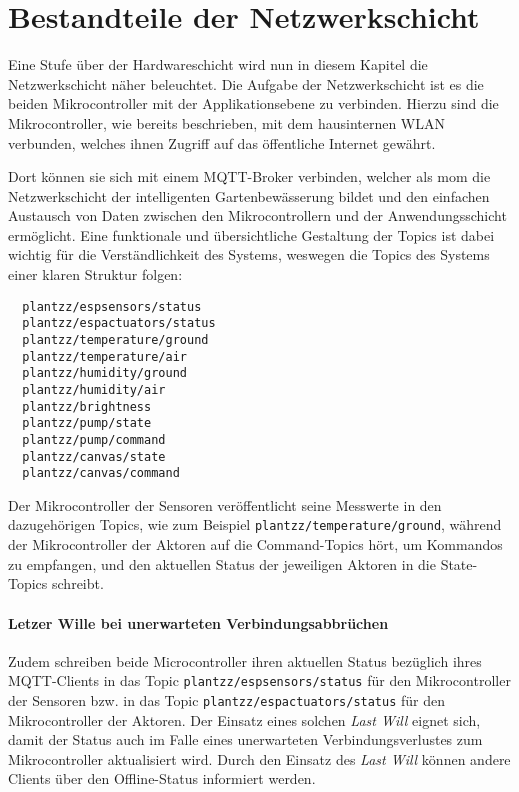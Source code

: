 
\section{Bestandteile der Netzwerkschicht}

Eine Stufe über der Hardwareschicht wird nun in diesem Kapitel die Netzwerkschicht näher beleuchtet.
Die Aufgabe der Netzwerkschicht ist es die beiden Mikrocontroller mit der Applikationsebene zu verbinden.
Hierzu sind die Mikrocontroller, wie bereits beschrieben, mit dem hausinternen WLAN verbunden, welches ihnen Zugriff auf das öffentliche Internet gewährt.

Dort können sie sich mit einem MQTT-Broker verbinden, welcher als \gls{mom} die Netzwerkschicht der intelligenten Gartenbewässerung bildet und den einfachen Austausch von Daten zwischen den Mikrocontrollern und der Anwendungsschicht ermöglicht. 
Eine funktionale und übersichtliche Gestaltung der Topics ist dabei wichtig für die Verständlichkeit des Systems, weswegen die Topics des Systems einer klaren Struktur folgen:

\begin{verbatim}
  plantzz/espsensors/status
  plantzz/espactuators/status
  plantzz/temperature/ground
  plantzz/temperature/air
  plantzz/humidity/ground
  plantzz/humidity/air
  plantzz/brightness
  plantzz/pump/state
  plantzz/pump/command
  plantzz/canvas/state
  plantzz/canvas/command
\end{verbatim}

Der Mikrocontroller der Sensoren veröffentlicht seine Messwerte in den dazugehörigen Topics, wie zum Beispiel \texttt{plantzz/temperature/ground}, während der Mikrocontroller der Aktoren auf die Command-Topics hört, um Kommandos zu empfangen, und den aktuellen Status der jeweiligen Aktoren in die State-Topics schreibt.

\paragraph{Letzer Wille bei unerwarteten Verbindungsabbrüchen}

Zudem schreiben beide Microcontroller ihren aktuellen Status bezüglich ihres MQTT-Clients in das Topic \texttt{plantzz/espsensors/status} für den Mikrocontroller der Sensoren bzw. in das Topic \texttt{plantzz/espactuators/status} für den Mikrocontroller der Aktoren. Der Einsatz eines solchen \textit{Last Will} eignet sich, damit der Status auch im Falle eines unerwarteten Verbindungsverlustes zum Mikrocontroller aktualisiert wird. Durch den Einsatz des \textit{Last Will} können andere Clients über den Offline-Status informiert werden.